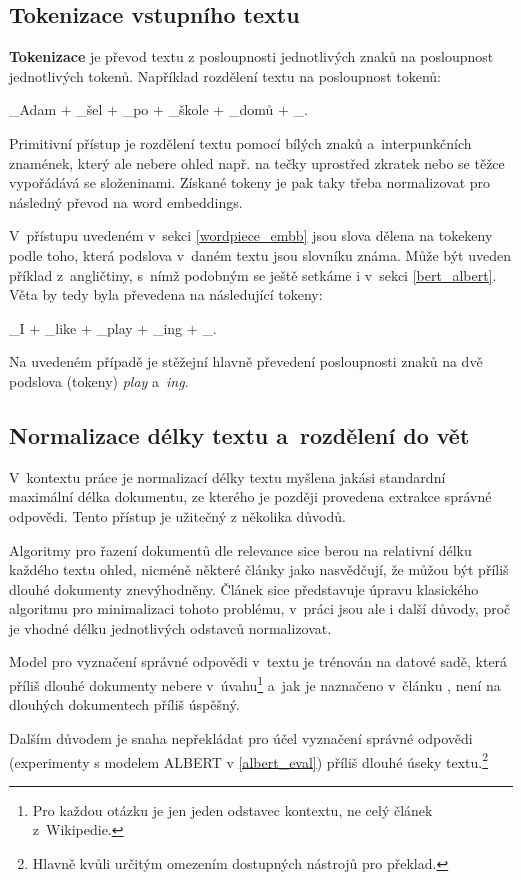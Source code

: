 \subsection{Tokenizace vstupního textu}
\textbf{Tokenizace} je převod textu z posloupnosti jednotlivých znaků na posloupnost jednotlivých tokenů. Například rozdělení textu  na posloupnost tokenů:
\begin{center}
    \_Adam $+$ \_šel $+$ \_po $+$ \_škole $+$ \_domů $+$ \_.
\end{center}
Primitivní přístup je rozdělení textu pomocí bílých znaků a~interpunkčních znamének, který ale nebere ohled např. na tečky uprostřed zkratek nebo se těžce vypořádává se složeninami. Získané tokeny je pak taky třeba normalizovat pro následný převod na word embeddings.\par
V~přístupu uvedeném v~sekci \ref{wordpiece_embb} jsou slova dělena na tokekeny podle toho, která podslova v~daném textu jsou slovníku známa. Může být uveden příklad z~angličtiny, s~nímž podobným se ještě setkáme i v~sekci \ref{bert_albert}. Věta  by tedy byla převedena na následující tokeny:
\begin{center}
    \_I $+$ \_like $+$ \_play $+$ \_ing $+$ \_.
\end{center}
Na uvedeném případě je stěžejní hlavně převedení posloupnosti znaků  na dvě podslova (tokeny) \emph{play} a~\emph{ing}.

\subsection{Normalizace délky textu a~rozdělení do vět}
V~kontextu práce je normalizací délky textu myšlena jakási standardní maximální délka dokumentu, ze kterého je později provedena extrakce správné odpovědi. Tento přístup je užitečný z několika důvodů.\par
Algoritmy pro řazení dokumentů dle relevance sice berou na relativní délku každého textu ohled, nicméně některé články jako \cite{bm25_too_long} nasvědčují, že můžou být příliš dlouhé dokumenty znevýhodněny. Článek \cite{bm25_too_long} sice představuje úpravu klasického algoritmu pro minimalizaci tohoto problému, v~práci jsou ale i další důvody, proč je vhodné délku jednotlivých odstavců normalizovat.\par
Model pro vyznačení správné odpovědi v~textu je trénován na datové sadě, která příliš dlouhé dokumenty nebere v~úvahu\footnote{Pro každou otázku je jen jeden odstavec kontextu, ne celý článek z~Wikipedie.} a~jak je naznačeno v~článku \cite{QA_long_multiple_span}, není na dlouhých dokumentech příliš úspěšný.\par
Dalším důvodem je snaha nepřekládat pro účel vyznačení správné odpovědi (experimenty s modelem ALBERT v \ref{albert_eval}) příliš dlouhé úseky textu.\footnote{Hlavně kvůli určitým omezením dostupných nástrojů pro překlad.}

